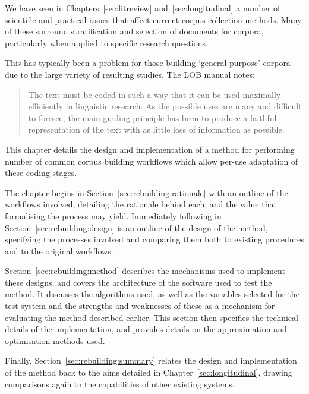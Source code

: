

We have seen in Chapters~\ref{sec:litreview} and~\ref{sec:longitudinal} a number of scientific and practical issues that affect current corpus collection methods.  Many of these surround stratification and selection of documents for corpora, particularly when applied to specific research questions.

This has typically been a problem for those building `general purpose' corpora due to the large variety of resulting studies.  The LOB manual\cite{johansson1986tagged} notes:

\begin{quote}
The text must be coded in such a way that it can be used maximally efficiently in linguistic research. As the possible uses are many and difficult to foresee, the main guiding principle has been to produce a faithful representation of the text with as little loss of information as possible.
\end{quote}


This chapter details the design and implementation of a method for performing number of common corpus building workflows which allow per-use adaptation of these coding stages.

The chapter begins in Section~\ref{sec:rebuilding:rationale} with an outline of the workflows involved, detailing the rationale behind each, and the value that formalising the process may yield.  Immediately following in Section~\ref{sec:rebuilding:design} is an outline of the design of the method, specifying the processes involved and comparing them both to existing procedures and to the original workflows.

Section~\ref{sec:rebuilding:method} describes the mechanisms used to implement these designs, and covers the architecture of the software used to test the method.  It discusses the algorithms used, as well as the variables selected for the test system and the strengths and weaknesses of these as a mechanism for evaluating the method described earlier.  This section then specifies the technical details of the implementation, and provides details on the approximation and optimisation methods used.  

Finally, Section~\ref{sec:rebuilding:summary} relates the design and implementation of the method back to the aims detailed in Chapter~\ref{sec:longitudinal}, drawing comparisons again to the capabilities of other existing systems.

